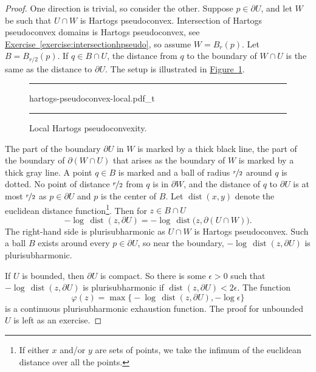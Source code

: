 \documentclass[12pt,openany]{book}
\theoremstyle{plain}
\theoremstyle{remark}
\theoremstyle{definition}
\newenvironment{myfig}{%
\begin{figure}[h!t]
\noindent\rule{\textwidth}{0.5pt}\vspace{12pt}\par\centering}%
{\par\noindent\rule{\textwidth}{0.5pt}
\end{figure}}
\theoremstyle{exercise}
\theoremstyle{example}
\newcommand{\figureref}[1]{\hyperref[#1]{Figure~\ref*{#1}}}
\newcommand{\exerciseref}[1]{\hyperref[#1]{Exercise~\ref*{#1}}}
\begin{document}
\begin{proof}
One direction is trivial, so consider the other.
Suppose $p \in \partial U$, and let
$W$ be such that $U \cap W$
is Hartogs pseudoconvex.  Intersection of
Hartogs pseudoconvex domains is Hartogs pseudoconvex,
see \exerciseref{exercise:intersectionhpseudo}, so
assume $W = B_r(p)$.
Let $B = B_{r/2}(p)$.  If $q \in B \cap U$, the distance from $q$ to the boundary of $W \cap U$ is the same as
the distance to $\partial U$.  The setup is illustrated in
\figureref{fig:hartogs-pseudoconvex-local}.

\begin{myfig}
{hartogs-pseudoconvex-local.pdf_t}
\caption{Local Hartogs pseudoconvexity.\label{fig:hartogs-pseudoconvex-local}}
\end{myfig}

The part of the boundary $\partial U$ in $W$ is marked by a thick
black line, the part of the boundary of $\partial (W \cap U)$ that arises as
the boundary of $W$ is marked by a thick gray line.  A point $q \in B$ is
marked and a ball of radius $\nicefrac{r}{2}$ around $q$ is dotted.
No point of distance $\nicefrac{r}{2}$ from $q$ is in $\partial W$, and
the distance of $q$ to $\partial U$ is at most $\nicefrac{r}{2}$ as $p \in \partial U$
and $p$ is the center of $B$.
%
Let $\operatorname{dist}(x,y)$ denote the
euclidean distance function\footnote{If either $x$ and/or $y$ are sets
of points, we take the infimum of the euclidean distance over all the points.}.
Then for $z \in B \cap U$
\begin{equation*}
- \log \, \operatorname{dist}(z, \partial U) =
- \log \, \operatorname{dist}\bigl(z, \partial (U \cap W)\bigr).
\end{equation*}
The right-hand side is plurisubharmonic as $U \cap W$ is Hartogs
pseudoconvex.  Such a ball $B$ exists around every $p \in \partial U$, so near
the boundary, $- \log \, \operatorname{dist}(z, \partial U)$ is
plurisubharmonic.

If $U$ is bounded, then $\partial U$ is compact.  So there is some
$\epsilon > 0$ such that $- \log \, \operatorname{dist}(z, \partial U)$
is plurisubharmonic if $\operatorname{dist}(z, \partial U) < 2\epsilon$.
The function
\begin{equation*}
\varphi(z) = \max \bigl\{
- \log \, \operatorname{dist}(z, \partial U) , - \log \epsilon \bigr\}
\end{equation*}
is a continuous plurisubharmonic exhaustion function.
The proof for
unbounded $U$ is left as an exercise.
\end{proof}
\end{document}
